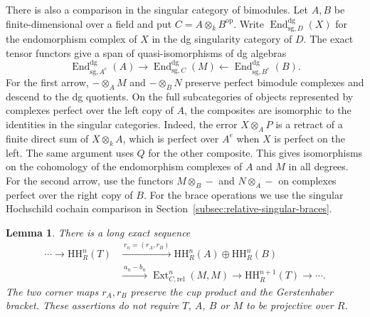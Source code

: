 \documentclass[12pt,a4paper,english,reqno]{amsart}
\numberwithin{equation}{section}
\theoremstyle{plain}
\newtheorem{lemma}[theorem]{Lemma}
\theoremstyle{definition}
\begin{document}
There is also a comparison in the singular category of
bimodules. Let $A,B$ be finite-dimensional over a field and
put $C=A\otimes_k B^{\mathrm{op}}$. Write
$\operatorname{End}_{\mathrm{sg},D}^{\mathrm{dg}}(X)$ for the
endomorphism complex of $X$ in the dg singularity category of
$D$. The exact tensor functors give a span of quasi-isomorphisms
of dg algebras
\[
 \operatorname{End}_{\mathrm{sg},A^e}^{\mathrm{dg}}(A)
 \longrightarrow \operatorname{End}_{\mathrm{sg},C}^{\mathrm{dg}}(M)
 \longleftarrow \operatorname{End}_{\mathrm{sg},B^e}^{\mathrm{dg}}(B).
\]
For the first arrow, $-\otimes_A M$ and $-\otimes_B N$
preserve perfect bimodule complexes and descend to the dg
quotients. On the full subcategories of objects represented
by complexes perfect over the left copy of $A$, the
composites are isomorphic to the identities in the singular
categories. Indeed, the error $X\otimes_A P$ is a retract of
a finite direct sum of $X\otimes_k A$, which is perfect over
$A^e$ when $X$ is perfect on the left. The same argument uses
$Q$ for the other composite. This gives isomorphisms on the
cohomology of the endomorphism complexes of $A$ and $M$ in
all degrees. For the second arrow, use the functors
$M\otimes_B-$ and $N\otimes_A-$ on complexes perfect over the
right copy of $B$. For the brace operations we use the
singular Hochschild cochain comparison in
Section~\ref{subsec:relative-singular-braces}.

\begin{lemma}
\label{lem:relative-triangular-gerstenhaber}
There is a long exact sequence
\begin{equation}
 \begin{aligned}
 \cdots\longrightarrow\mathrm{HH}^n_R(T)
  &\xrightarrow{\ r_n=(r_A,r_B)\ }
      \mathrm{HH}^n_R(A)\oplus\mathrm{HH}^n_R(B)\\
  &\xrightarrow{\ a_n-b_n\ }
      \operatorname{Ext}_{C,\mathrm{rel}}^n(M,M)
      \longrightarrow\mathrm{HH}^{n+1}_R(T)
      \longrightarrow\cdots .
 \end{aligned}
 \label{eq:relative-triangular-les}
\end{equation}
The two corner maps $r_A,r_B$ preserve the cup product and the
Gerstenhaber bracket.  These assertions do not require $T$, $A$, $B$
or $M$ to be projective over $R$.
\end{lemma}
\end{document}
